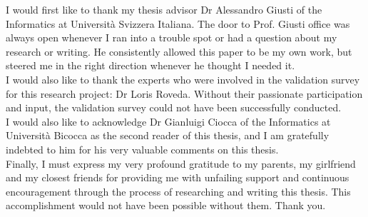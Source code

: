 
I would first like to thank my thesis advisor Dr Alessandro Giusti of the Informatics at Università Svizzera Italiana. The door to Prof. Giusti office was always open whenever I ran into a trouble spot or had a question about my research or writing. He consistently allowed this paper to be my own work, but steered me in the right direction whenever he thought I needed it. \\

\noindent I would also like to thank the experts who were involved in the validation survey for this research project: Dr Loris Roveda. Without their passionate participation and input, the validation survey could not have been successfully conducted. \\

\noindent I would also like to acknowledge Dr Gianluigi Ciocca of the Informatics at Università Bicocca as the second reader of this thesis, and I am gratefully indebted to him for his very valuable comments on this thesis. \\

\noindent Finally, I must express my very profound gratitude to my parents, my girlfriend and my closest friends for providing me with unfailing support and continuous encouragement through the process of researching and writing this thesis. This accomplishment would not have been possible without them. Thank you.